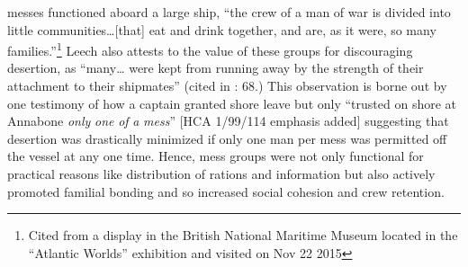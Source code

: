 messes functioned aboard a large ship, “the crew of a man of war is divided into little communities…[that] eat and drink together, and are, as it were, so many families.”\footnote{Cited from a display in the British National Maritime Museum located in the “Atlantic Worlds” exhibition and visited on Nov 22 2015} Leech also attests to the value of these groups for discouraging desertion, as “many… were kept from running away by the strength of their attachment to their shipmates” (cited in \citealt{AdkinsAdkins2008}: 68.) This observation is borne out by one testimony of how a captain granted shore leave but only “trusted on shore at Annabone \textit{only} \textit{one} \textit{of} \textit{a} \textit{mess}” [HCA 1/99/114 emphasis added] suggesting that desertion was drastically minimized if only one man per mess was permitted off the vessel at any one time. Hence, mess groups were not only functional for practical reasons like distribution of rations and information but also actively promoted familial bonding and so increased social cohesion and crew retention.  

